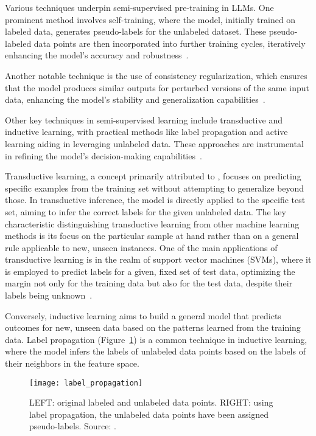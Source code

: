 Various techniques underpin semi-supervised pre-training in LLMs. One prominent method involves self-training, where the model, initially trained on labeled data, generates pseudo-labels for the unlabeled dataset.
These pseudo-labeled data points are then incorporated into further training cycles, iteratively enhancing the model's accuracy and robustness~\cite{lee2013pseudo}.

Another notable technique is the use of consistency regularization, which ensures that the model produces similar outputs for perturbed versions of the same input data, enhancing the model's stability and generalization capabilities~\cite{sajjadi2016regularization}.

Other key techniques in semi-supervised learning include transductive and inductive learning, with practical methods like label propagation and active learning aiding in leveraging unlabeled data.
These approaches are instrumental in refining the model's decision-making capabilities~\cite{bergmann2023semi}.

Transductive learning, a concept primarily attributed to \textcite{vapnik1998statistical}, focuses on predicting specific examples from the training set without attempting to generalize beyond those.
In transductive inference, the model is directly applied to the specific test set, aiming to infer the correct labels for the given unlabeled data.
The key characteristic distinguishing transductive learning from other machine learning methods is its focus on the particular sample at hand rather than on a general rule applicable to new, unseen instances.
One of the main applications of transductive learning is in the realm of support vector machines (SVMs), where it is employed to predict labels for a given, fixed set of test data, optimizing the margin not only for the training data but also for the test data, despite their labels being unknown~\cite{joachims1999transductive}.

Conversely, inductive learning aims to build a general model that predicts outcomes for new, unseen data based on the patterns learned from the training data.
Label propagation (Figure~\ref{fig:label_propagation}) is a common technique in inductive learning, where the model infers the labels of unlabeled data points based on the labels of their neighbors in the feature space.

\begin{figure}[h]
	\centering
	\texttt{[image: label\_propagation]}
	\caption{LEFT: original labeled and unlabeled data points. RIGHT: using label propagation, the unlabeled data points have been assigned pseudo-labels. Source: \textcite{bergmann2023semi}.}
	\label{fig:label_propagation}
\end{figure}

